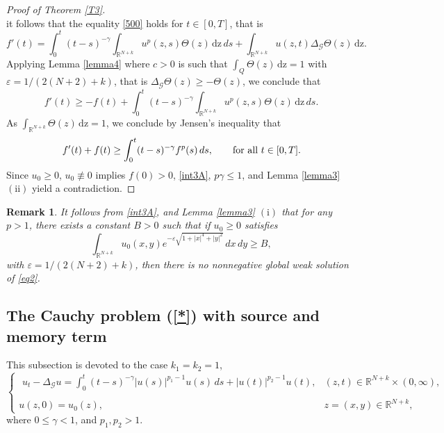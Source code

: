 \documentclass[reqno,11pt]{amsart}
\newtheorem{remark}{Remark}[section]
\numberwithin{equation}{section}
\def\R{{\mathbb {R}}}
\def\R{\mathbb{R}}
\begin{document}
\begin{proof}[Proof of Theorem \ref{T3}]
$$	$$
	it follows that the equality \eqref{500} holds for $t\in[0,T]$, that is
	$$f'(t) =\int_0^t(t-s)^{-\gamma}\int_{\R^{N+k}} u^p(z,s)\Theta(z)\,\mathrm{dz}\,ds+\int_{\R^{N+k}}u(z,t)\Delta_{\mathcal{G}}\Theta(z)\,\mathrm{dz}.
	$$
	Applying Lemma \ref{lemma4} where $c>0$ is such that $\displaystyle \int_Q\Theta(z)\,\mathrm{dz}=1$ with $\varepsilon=1/(2(N+2)+k)$, that is $\Delta_{\mathcal{G}}\Theta(z)\geq-\Theta(z)$, we conclude that
	$$f'(t)\geq -f(t)+\int_0^t(t-s)^{-\gamma}\int_{\R^{N+k}} u^p(z,s)\Theta(z)\,\mathrm{dz}\,ds.$$
	As $\displaystyle \int_{\R^{N+k}}\Theta (z)\,\mathrm{dz}=1$, we conclude by Jensen’s inequality that
	\begin{equation}\label{int3A}
		f'(t)+f(t)\geq\int_0^t(t-s)^{-\gamma}f^p(s)\,ds,\qquad\hbox{for all}\,\,t\in[0,T].
	\end{equation}
	Since $u_0\geq0$, $u_0\not\equiv0$ implies $f(0)>0$, \eqref{int3A}, $p\gamma\leq 1$, and Lemma \ref{lemma3} $\mathrm{(ii)}$ yield a contradiction. 
\end{proof}


\begin{remark} It follows from \eqref{int3A}, and Lemma \ref{lemma3} $\mathrm{(i)}$ that for any $p >1$, there exists a constant $B> 0$ such that
	if $u_0\geq0$ satisfies
	$$\int_{\R^{N+k}}u_0(x,y)e^{-\varepsilon\sqrt{1+|x|^4+|y|^2}}\,dx\,dy\geq B,$$
	with $\varepsilon=1/(2(N+2)+k)$, then there is no nonnegative global weak solution of \eqref{eq2}.
\end{remark} 




\subsection{The Cauchy problem (\ref{*}) with source and memory term}
This subsection is devoted to the case $k_1=k_2=1$,
\begin{equation}\label{eq3}
	\left\{\begin{array}{ll}
		\,\, \displaystyle {u_{t}-\Delta_{\mathcal{G}}
			u =\int_0^t(t-s)^{-\gamma}|u(s)|^{p_1-1}u(s)\,ds+|u(t)|^{p_2-1}u(t),} &\displaystyle {(z,t)\in{\mathbb{R}}^{N+k}\times (0,\infty),}\\
		{}\\
		\displaystyle{u(z,0)=  u_0(z),\qquad\qquad}&\displaystyle{z=(x,y)\in {\mathbb{R}}^{N+k},}
	\end{array}
	\right.
\end{equation} 
where $0\leq \gamma<1$, and $p_1,p_2>1$.
\end{document}
